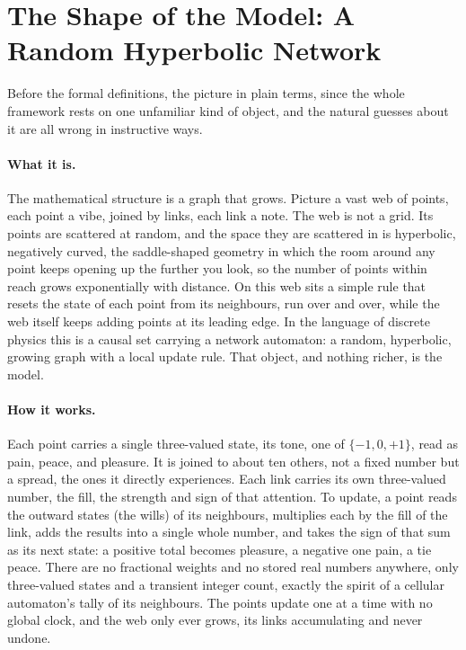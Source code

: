 \section{The Shape of the Model: A Random Hyperbolic Network}
\label{sec:shape}

Before the formal definitions, the picture in plain terms, since the whole framework
rests on one unfamiliar kind of object, and the natural guesses about it are all wrong
in instructive ways.

\paragraph{What it is.}
The mathematical structure is a graph that grows. Picture a vast web of points, each
point a vibe, joined by links, each link a note. The web is not a grid. Its points are
scattered at random, and the space they are scattered in is hyperbolic, negatively
curved, the saddle-shaped geometry in which the room around any point keeps opening up
the further you look, so the number of points within reach grows exponentially with
distance. On this web sits a simple rule that resets the state of each point from its
neighbours, run over and over, while the web itself keeps adding points at its leading
edge. In the language of discrete physics this is a causal set carrying a network
automaton: a random, hyperbolic, growing graph with a local update rule. That object,
and nothing richer, is the model.

\paragraph{How it works.}
Each point carries a single three-valued state, its tone, one of $\{-1,0,+1\}$, read as
pain, peace, and pleasure. It is joined to about ten others, not a fixed number but a
spread, the ones it directly experiences. Each link carries its own three-valued number,
the fill, the strength and sign of that attention. To update, a point reads the outward
states (the wills) of its neighbours, multiplies each by the fill of the link, adds the
results into a single whole number, and takes the sign of that sum as its next state: a
positive total becomes pleasure, a negative one pain, a tie peace. There are no
fractional weights and no stored real numbers anywhere, only three-valued states and a
transient integer count, exactly the spirit of a cellular automaton's tally of its
neighbours. The points update one at a time with no global clock, and the web only ever
grows, its links accumulating and never undone.

